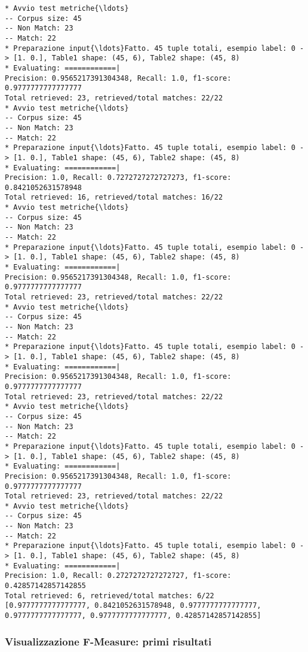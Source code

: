 \documentclass[11pt]{article}
\begin{document}
    \begin{Verbatim}[commandchars=\\\{\}]
* Avvio test metriche{\ldots}
-- Corpus size: 45
-- Non Match: 23
-- Match: 22
* Preparazione input{\ldots}Fatto. 45 tuple totali, esempio label: 0 -> [1. 0.], Table1 shape: (45, 6), Table2 shape: (45, 8)
* Evaluating: ============|
Precision: 0.9565217391304348, Recall: 1.0, f1-score: 0.9777777777777777
Total retrieved: 23, retrieved/total matches: 22/22
* Avvio test metriche{\ldots}
-- Corpus size: 45
-- Non Match: 23
-- Match: 22
* Preparazione input{\ldots}Fatto. 45 tuple totali, esempio label: 0 -> [1. 0.], Table1 shape: (45, 6), Table2 shape: (45, 8)
* Evaluating: ============|
Precision: 1.0, Recall: 0.7272727272727273, f1-score: 0.8421052631578948
Total retrieved: 16, retrieved/total matches: 16/22
* Avvio test metriche{\ldots}
-- Corpus size: 45
-- Non Match: 23
-- Match: 22
* Preparazione input{\ldots}Fatto. 45 tuple totali, esempio label: 0 -> [1. 0.], Table1 shape: (45, 6), Table2 shape: (45, 8)
* Evaluating: ============|
Precision: 0.9565217391304348, Recall: 1.0, f1-score: 0.9777777777777777
Total retrieved: 23, retrieved/total matches: 22/22
* Avvio test metriche{\ldots}
-- Corpus size: 45
-- Non Match: 23
-- Match: 22
* Preparazione input{\ldots}Fatto. 45 tuple totali, esempio label: 0 -> [1. 0.], Table1 shape: (45, 6), Table2 shape: (45, 8)
* Evaluating: ============|
Precision: 0.9565217391304348, Recall: 1.0, f1-score: 0.9777777777777777
Total retrieved: 23, retrieved/total matches: 22/22
* Avvio test metriche{\ldots}
-- Corpus size: 45
-- Non Match: 23
-- Match: 22
* Preparazione input{\ldots}Fatto. 45 tuple totali, esempio label: 0 -> [1. 0.], Table1 shape: (45, 6), Table2 shape: (45, 8)
* Evaluating: ============|
Precision: 0.9565217391304348, Recall: 1.0, f1-score: 0.9777777777777777
Total retrieved: 23, retrieved/total matches: 22/22
* Avvio test metriche{\ldots}
-- Corpus size: 45
-- Non Match: 23
-- Match: 22
* Preparazione input{\ldots}Fatto. 45 tuple totali, esempio label: 0 -> [1. 0.], Table1 shape: (45, 6), Table2 shape: (45, 8)
* Evaluating: ============|
Precision: 1.0, Recall: 0.2727272727272727, f1-score: 0.42857142857142855
Total retrieved: 6, retrieved/total matches: 6/22
[0.9777777777777777, 0.8421052631578948, 0.9777777777777777, 0.9777777777777777, 0.9777777777777777, 0.42857142857142855]

    \end{Verbatim}

    \subsubsection{Visualizzazione F-Measure: primi
risultati}\label{visualizzazione-f-measure-primi-risultati}
\end{document}
